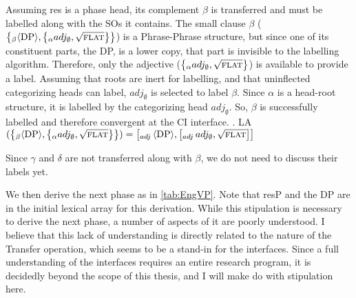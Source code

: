 \documentclass[MilwayThesis]{subfiles}
\begin{document}
Assuming res is a phase head, its complement $\beta$ is transferred and must be labelled along with the SOs it contains.
The small clause $\beta$ ($\left\{_\beta \langle \text{DP}\rangle, \left\{_\alpha adj_\emptyset, \sqrt{\textsc{flat}} \right\} \right\}$) is a Phrase-Phrase structure, but since one of its constituent parts, the DP, is a lower copy, that part is invisible to the labelling algorithm.
Therefore, only the adjective ($\left\{_\alpha adj_\emptyset, \sqrt{\textsc{flat}} \right\}$) is available to provide a label.
Assuming that roots are inert for labelling, and that uninflected categorizing heads can label, $adj_\emptyset$ is selected to label $\beta$.
Since $\alpha$ is a head-root structure, it is labelled by the categorizing head $adj_\emptyset$.
So, $\beta$ is successfully labelled and therefore convergent at the CI interface.
\ex. LA$(\left\{_\beta \langle\text{DP}\rangle, \left\{_\alpha adj_\emptyset, \sqrt{\textsc{flat}} \right\} \right\}) = \left[_{adj}\, \langle\text{DP}\rangle, \left[_{adj}\, adj_\emptyset, \sqrt{\textsc{flat}} \right]  \right]$

Since $\gamma$ and $\delta$ are not transferred along with $\beta$, we do not need to discuss their labels yet.

We then derive the next phase as in \autoref{tab:EngVP}.
Note that resP and the DP are in the initial lexical array for this derivation.
While this stipulation is necessary to derive the next phase, a number of aspects of it are poorly understood.
I believe that this lack of understanding is directly related to the nature of the Transfer operation, which seems to be a stand-in for the interfaces.
Since a full understanding of the interfaces requires an entire research program, it is decidedly beyond the scope of this thesis, and I will make do with stipulation here.
\end{document}
